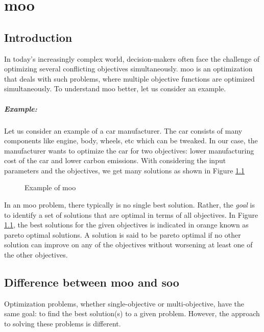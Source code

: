 \chapter{\acrlong{moo}}

\section{Introduction} \label{what is moo}
In today's increasingly complex world, decision-makers often face the challenge of optimizing several conflicting objectives simultaneously. \acrfull{moo} 
is an optimization that deals with such problems, where multiple objective functions are optimized simultaneously. To understand \acrshort{moo} better, 
let us consider an example.

\paragraph{Example:}
Let us consider an example of a car manufacturer. The car consists of many components like engine, body, wheels, etc which can be
tweaked. In our case, the manufacturer wants to optimize the car for two objectives: lower manufacturing cost of the car and lower carbon emissions. With 
considering the input parameters and the objectives, we get many solutions as shown in Figure \ref{moo}

\begin{figure}[!h]
	\begin{center}
		
	\end{center}
    \caption{Example of \acrshort{moo}}
    \label{moo}
\end{figure}
In an \acrshort{moo} problem, there typically is no single best solution. Rather, the \textit{goal} is to identify a set of solutions that are optimal in terms 
of all objectives. In Figure \ref{moo}, the best solutions for the given objectives is indicated in orange known as pareto optimal solutions. A solution is said 
to be pareto optimal if no other solution can improve on any of the objectives without worsening at least one of the other objectives.

\section{Difference between \acrshort{moo} and \acrshort{soo}}
Optimization problems, whether single-objective or multi-objective, have the same goal: to find the best solution(s) to a given problem. However, the approach
to solving these problems is different. 

